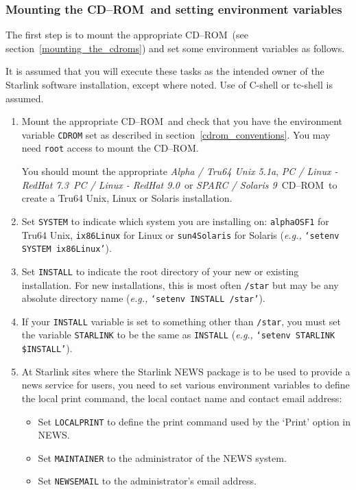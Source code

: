 \documentclass[twoside,11pt]{article}
\newcommand{\htmlref}[2]{#1}
\newcommand{\latex}[1]{#1}
\renewcommand{\_}{\texttt{\symbol{95}}}
\newcommand{\cdrom}{CD--ROM}
\newcommand{\cdrom}{CD-ROM}
\newcommand{\axp}{\textit{Alpha / Tru64 Unix 5.1a}}
\newcommand{\rha}{\textit{PC / Linux - RedHat 7.3}}
\newcommand{\rhb}{\textit{PC / Linux - RedHat 9.0}}
\newcommand{\sol}{\textit{SPARC / Solaris 9}}
\begin{document}
\subsubsection{Mounting the \cdrom\ and setting environment variables}

The first step is to \htmlref{mount}{mounting_the_cdrom} the appropriate
\cdrom\ \latex{(see section~\ref{mounting_the_cdroms})} and set
some environment variables as follows.

It is assumed that you will execute these tasks as the intended owner of
the Starlink software installation, except where noted.  Use of C-shell
or tc-shell is assumed.

\begin{enumerate}

\item Mount the appropriate \cdrom\ and check that you have the
environment variable \texttt{CDROM} set as described in
section~\ref{cdrom_conventions}.  You may need \texttt{root} access to
mount the \cdrom.

You should mount the appropriate \axp, \rha\, \rhb\ or \sol\ \cdrom\ to
create a Tru64 Unix, Linux or Solaris installation.

\item Set \texttt{SYSTEM} to indicate which system you are installing on:
\texttt{alpha\_OSF1} for Tru64 Unix, \texttt{ix86\_Linux} for Linux
or \texttt{sun4\_Solaris} for Solaris (\emph{e.g.,} \texttt{`setenv SYSTEM
ix86\_Linux'}).

\item Set \texttt{INSTALL} to indicate the root directory of your new
or existing installation.  For new installations, this is most often
\texttt{/star} but may be any absolute directory name (\emph{e.g.,}
\texttt{`setenv INSTALL /star'}).

\item If your \texttt{INSTALL} variable is set to something other than
\texttt{/star}, you must set the variable \texttt{STARLINK} to be the
same as \texttt{INSTALL} (\emph{e.g.,} \texttt{`setenv STARLINK \$INSTALL'}).

\item At Starlink sites where the Starlink NEWS package is to be used to
provide a news service for users, you need to set various environment
variables to define the local print command, the local contact name and
contact email address:

\begin{itemize}
\item Set \texttt{LOCALPRINT} to define the print command used by the
`Print' option in NEWS.
\item Set \texttt{MAINTAINER} to the administrator of the NEWS system.
\item Set \texttt{NEWSEMAIL} to the administrator's email address.
\end{itemize}


\end{enumerate}
\end{document}
